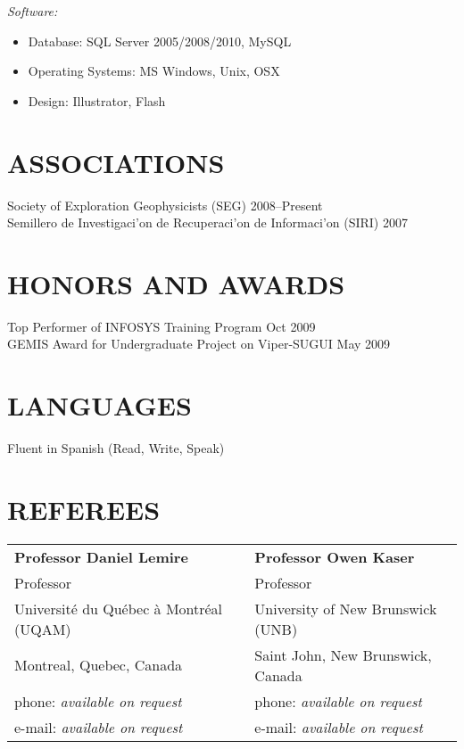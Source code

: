 \documentclass[line,margin]{res}
\begin{document}
\begin{resume}
    {\sl Software:}
    \begin{itemize} \itemsep -2pt
        \item Database: SQL Server 2005/2008/2010, MySQL
        \item Operating Systems: MS Windows, Unix, OSX
        \item Design: Illustrator, Flash
    \end{itemize} 

\section{ ASSOCIATIONS} %
\label{sec:associations}
    Society of Exploration Geophysicists (SEG) \hfill 2008--Present\\
    Semillero de Investigaci\a'on de Recuperaci\a'on de Informaci\a'on (SIRI) \hfill 2007\\

\section{ HONORS AND AWARDS} %
\label{sec:honors_and_awards}
    Top Performer of INFOSYS Training Program \hfill Oct 2009\\
    GEMIS Award for Undergraduate Project on Viper-SUGUI \hfill May 2009\\

\section{ LANGUAGES} %
\label{sec:languages}
    Fluent in Spanish (Read, Write, Speak)


\section{REFEREES} %
\label{sec:referees}

\begin{tabular}{@{}p{6cm}p{6cm}}
\textbf{Professor Daniel Lemire}        &  \textbf{Professor Owen Kaser}            \\
Professor                               &  Professor                                \\
Université du Québec à Montréal (UQAM)  &  University of New Brunswick (UNB)        \\
Montreal, Quebec, Canada                &  Saint John, New Brunswick, Canada        \\
phone: \textsl{available on request}    &  phone: \textsl{available on request}     \\
e-mail: \textsl{available on request}   &  e-mail: \textsl{available on request}    \\
\end{tabular}


\end{resume}
\end{document}
